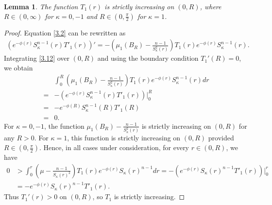 \documentclass[11pt,leqno]{amsart}
\newtheorem{lemma}{Lemma}[section]
\def\k{\kappa}
\def\k{\kappa}
\numberwithin{equation}{section}
\begin{document}
\begin{lemma}\label{lm3.2}
  The function  $T_{1}(r)$ is strictly increasing on $(0,R)$, where $R\in (0,\infty)$ for $\kappa=0,-1$ and $R\in (0,\frac{\pi}{2})$ for $\kappa=1$.
\end{lemma}
\begin{proof}
   Equation \eqref{3.2} can be rewritten as 
   \begin{align}\label{3.12}
       (e^{-\phi(r)}S_{\kappa}^{n-1}(r)T'_{1}(r))'=-(\mu_1(B_R)-\frac{n-1}{S_{\k}^{2}(r)})T_{1}(r)e^{-\phi(r)}S_{\k}^{n-1}(r).
   \end{align}
   Integrating  \eqref{3.12} over $(0,R)$ and using the boundary condition $T_1'(R)=0$, we obtain
   \begin{align*}
        &\int_{0}^{R}(\mu_1(B_R)-\frac{n-1}{S_{\k}^{2}(r)})T_{1}(r)e^{-\phi(r)}S_{\k}^{n-1}(r)dr\\
        =& -(e^{-\phi(r)}S_{\kappa}^{n-1}(r)T'_{1}(r))\Big|_{0}^{R}\\
        =&-e^{-\phi(R)}S_{\kappa}^{n-1}(R)T'_{1}(R)\\
        =&0.
   \end{align*}
  For $\kappa=0,-1$, the function $\mu_1(B_R)-\frac{n-1}{S_{\k}^{2}(r)}$ is strictly increasing on $(0,R)$ for any $R>0$. For $\kappa=1$, this function is strictly increasing on $(0,R)$ provided $R\in (0,\frac{\pi}{2})$. Hence, in all cases under consideration, for every $r\in (0,R)$, we have 
  \begin{align*}
       0&> \int_{0}^{r}(\mu-\frac{n-1}{S_{\k}(r)^{2}})T_{1}(r)e^{-\phi(r)}S_{\k}(r)^{n-1}dr= -(e^{-\phi(r)}S_{\kappa}(r)^{n-1}T'_{1}(r))\Big|_{0}^{r}\nonumber\\
       &=-e^{-\phi(r)}S_{\kappa}(r)^{n-1}T'_{1}(r).
  \end{align*}
Thus $T_1'(r)>0$ on $(0, R)$, so $T_{1}$ is strictly increasing.
\end{proof}
\end{document}
